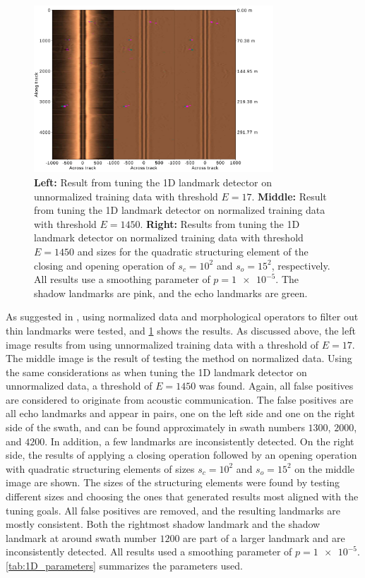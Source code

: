 \begin{figure} [hb!]
    \centering
    \includegraphics[trim=0cm 0cm 2.5cm 0cm, clip=true, width=0.8\textwidth]{figures/1D_result_training.pdf}
    \caption{\textbf{Left:} Result from tuning the 1D landmark detector on unnormalized training data with threshold $E = 17$. \textbf{Middle:} Result from tuning the 1D landmark detector on normalized training data with threshold $E = 1450$. \textbf{Right:} Results from tuning the 1D landmark detector on normalized training data with threshold $E = 1450$ and sizes for the quadratic structuring element of the closing and opening operation of $s_c = 10^2$ and $s_o = 15^2$, respectively. All results use a smoothing parameter of $p = \num{1e-5}$. The shadow landmarks are pink, and the echo landmarks are green.}
    \label{fig:1D_tuning_results}
\end{figure}

As suggested in \cite{Al-Rawi2017LandmarkImages}, using normalized data and morphological operators to filter out thin landmarks were tested, and \cref{fig:1D_tuning_results} shows the results. As discussed above, the left image results from using unnormalized training data with a threshold of $E = 17$. The middle image is the result of testing the method on normalized data. Using the same considerations as when tuning the 1D landmark detector on unnormalized data, a threshold of $E = 1450$ was found. Again, all false positives are considered to originate from acoustic communication. The false positives are all echo landmarks and appear in pairs, one on the left side and one on the right side of the swath, and can be found approximately in swath numbers $1300$, $2000$, and $4200$. In addition, a few landmarks are inconsistently detected. On the right side, the results of applying a closing operation followed by an opening operation with quadratic structuring elements of sizes $s_c = 10^2$ and $s_o = 15^2$ on the middle image are shown. The sizes of the structuring elements were found by testing different sizes and choosing the ones that generated results most aligned with the tuning goals. All false positives are removed, and the resulting landmarks are mostly consistent. Both the rightmost shadow landmark and the shadow landmark at around swath number $1200$ are part of a larger landmark and are inconsistently detected. All results used a smoothing parameter of $p = \num{1e-5}$. \cref{tab:1D_parameters} summarizes the parameters used. 

